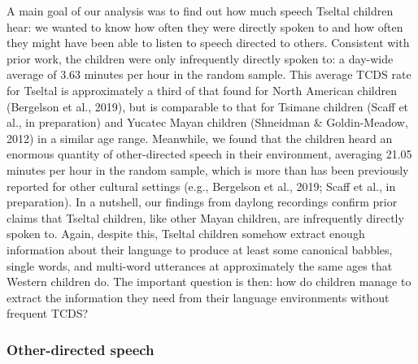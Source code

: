 \documentclass[floatsintext,man]{apa6}
\theoremstyle{definition}
\theoremstyle{definition}
\theoremstyle{definition}
\theoremstyle{remark}
\begin{document}
A main goal of our analysis was to find out how much speech Tseltal
children hear: we wanted to know how often they were directly spoken to
and how often they might have been able to listen to speech directed to
others. Consistent with prior work, the children were only infrequently
directly spoken to: a day-wide average of 3.63 minutes per hour in the
random sample. This average TCDS rate for Tseltal is approximately a
third of that found for North American children (Bergelson et al.,
2019), but is comparable to that for Tsimane children (Scaff et al., in
preparation) and Yucatec Mayan children (Shneidman \& Goldin-Meadow,
2012) in a similar age range. Meanwhile, we found that the children
heard an enormous quantity of other-directed speech in their
environment, averaging 21.05 minutes per hour in the random sample,
which is more than has been previously reported for other cultural
settings (e.g., Bergelson et al., 2019; Scaff et al., in preparation).
In a nutshell, our findings from daylong recordings confirm prior claims
that Tseltal children, like other Mayan children, are infrequently
directly spoken to. Again, despite this, Tseltal children somehow
extract enough information about their language to produce at least some
canonical babbles, single words, and multi-word utterances at
approximately the same ages that Western children do. The important
question is then: how do children manage to extract the information they
need from their language environments without frequent TCDS?

\subsubsection{Other-directed speech}\label{other-directed-speech}
\end{document}
